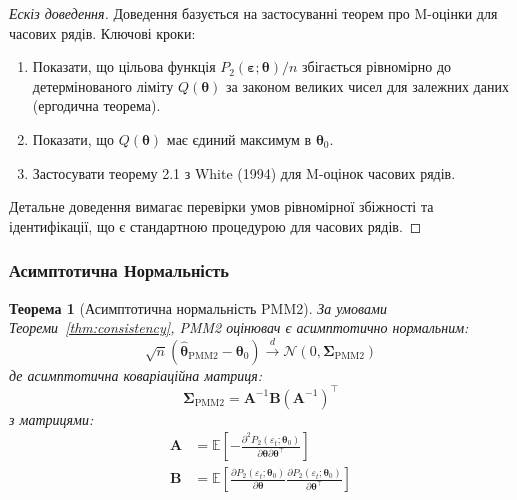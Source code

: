 \documentclass[12pt,a4paper]{article}
\newtheorem{theorem}{Теорема}[section]
\begin{document}
\begin{proof}[Ескіз доведення]
Доведення базується на застосуванні теорем про M-оцінки для часових рядів. Ключові кроки:
\begin{enumerate}
    \item Показати, що цільова функція $P_2(\boldsymbol{\varepsilon}; \boldsymbol{\theta})/n$ збігається рівномірно до детермінованого ліміту $Q(\boldsymbol{\theta})$ за законом великих чисел для залежних даних (ергодична теорема).

    \item Показати, що $Q(\boldsymbol{\theta})$ має єдиний максимум в $\boldsymbol{\theta}_0$.

    \item Застосувати теорему 2.1 з White (1994) для M-оцінок часових рядів.
\end{enumerate}
Детальне доведення вимагає перевірки умов рівномірної збіжності та ідентифікації, що є стандартною процедурою для часових рядів.
\end{proof}

\subsubsection{Асимптотична Нормальність}

\begin{theorem}[Асимптотична нормальність PMM2]
\label{thm:asymptotic_normality}
За умовами Теореми~\ref{thm:consistency}, PMM2 оцінювач є асимптотично нормальним:
\begin{equation}
\label{eq:asymptotic_normality}
\sqrt{n}(\hat{\boldsymbol{\theta}}_{\text{PMM2}} - \boldsymbol{\theta}_0) \xrightarrow{d} \mathcal{N}(0, \boldsymbol{\Sigma}_{\text{PMM2}})
\end{equation}
де асимптотична коваріаційна матриця:
\begin{equation}
\label{eq:asymptotic_covariance}
\boldsymbol{\Sigma}_{\text{PMM2}} = \mathbf{A}^{-1} \mathbf{B} (\mathbf{A}^{-1})^\top
\end{equation}
з матрицями:
\begin{align}
\mathbf{A} &= \mathbb{E}\left[ -\frac{\partial^2 P_2(\varepsilon_t; \boldsymbol{\theta}_0)}{\partial \boldsymbol{\theta} \partial \boldsymbol{\theta}^\top} \right] \label{eq:matrix_A} \\
\mathbf{B} &= \mathbb{E}\left[ \frac{\partial P_2(\varepsilon_t; \boldsymbol{\theta}_0)}{\partial \boldsymbol{\theta}} \frac{\partial P_2(\varepsilon_t; \boldsymbol{\theta}_0)}{\partial \boldsymbol{\theta}^\top} \right] \label{eq:matrix_B}
\end{align}
\end{theorem}
\end{document}
